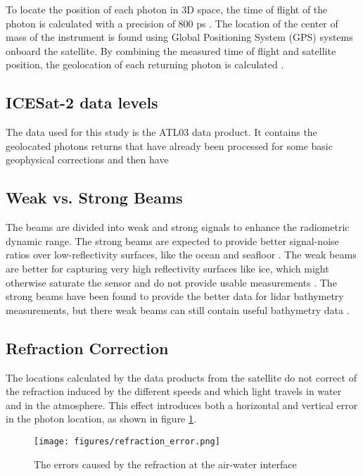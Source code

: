 To locate the position of each photon in 3D space, the time of flight of the photon is calculated with a precision of 800 ps \parencite{Neumann2019d}. The location of the center of mass of the instrument is found using Global Positioning System (GPS) systems onboard the satellite. By combining the measured time of flight and satellite position, the geolocation of each returning photon is calculated \parencite{Neumann2019d}.


\subsection{ICESat-2 data levels}
The data used for this study is the ATL03 data product. It contains the geolocated photons returns that have already been processed for some basic geophysical corrections and then have
\subsection{Weak vs. Strong Beams}

The beams are divided into weak and strong signals to enhance the radiometric dynamic range. The strong beams are expected to provide better signal-noise ratios over low-reflectivity surfaces, like the ocean and seafloor \parencite{Neumann2019d}. The weak beams are better for capturing very high reflectivity surfaces like ice, which might otherwise saturate the sensor and do not provide usable measurements \parencite{}. The strong beams have been found to provide the better data for lidar bathymetry measurements, but there weak beams can still contain useful bathymetry data \parencite{}.


\subsection{Refraction Correction}
The locations calculated by the data products from the satellite do not correct of the refraction induced by the different speeds and which light travels in water and in the atmosphere. This effect introduces both a horizontal and vertical error in the photon location, as shown in figure \ref{refract-image}.

\begin{figure}[ht]
      \centering
      \texttt{[image: figures/refraction\_error.png]}
      \caption{The errors caused by the refraction at the air-water interface}
      \label{refract-image}
\end{figure}

